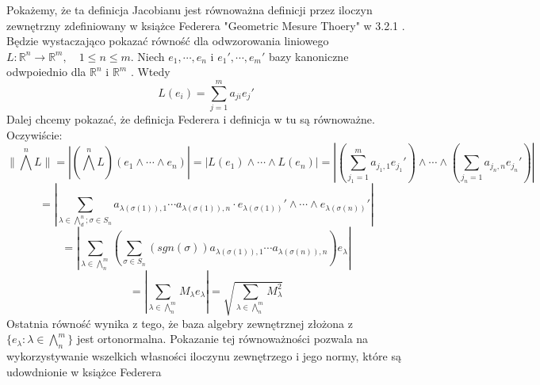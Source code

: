 \begin{lem}
	Pokażemy, że ta definicja Jacobianu jest równoważna definicji przez iloczyn zewnętrzny zdefiniowany w książce Federera "Geometric Mesure Thoery" w 3.2.1 \citep{Federer}. Będzie wystaczająco pokazać równość dla odwzorowania liniowego $L: \mathbb{R}^n \rightarrow \mathbb{R}^m, \quad 1 \leq n \leq m$. Niech $e_1, \cdots, e_n$ i $e_1', \cdots, e_m'$ bazy kanoniczne odwpoiednio dla $\mathbb{R}^n$ i $\mathbb{R}^m$ . Wtedy $$
		L(e_i) = \sum_{j=1}^m a_{ji} e_j'
	$$
	Dalej chcemy pokazać, że definicja Federera i definicja w tu są równoważne. Oczywiście:
	$$
		\| \bigwedge^n L \| = |(\bigwedge^n L) (e_1 \wedge \cdots \wedge e_n)| 
		= |L(e_1) \wedge \cdots \wedge L(e_n)| 
		= \left| (\sum^m_{j_1=1}a_{j_1, 1} e_{j_1}') \wedge \cdots \wedge (\sum_{j_n=1} a_{j_n, n} e_{j_n}') \right| 
	$$
	$$
		= \left| \sum_{\lambda \in \bigwedge^n_d; \sigma \in S_n} a_{\lambda(\sigma(1)), 1} \cdots a_{\lambda(\sigma(1)), n} 
			\cdot e_{\lambda(\sigma(1))}' \wedge \cdots \wedge e_{\lambda(\sigma(n))}'\right|
	$$
	$$
		= \left| \sum_{\lambda \in \bigwedge^m_n} \left( \sum_{\sigma \in S_n} (sgn(\sigma))a_{\lambda(\sigma(1)), 1} \cdots a_{\lambda(\sigma(n)), n} \right) e_{\lambda} \right|
	$$
	$$
		= \left| \sum_{\lambda \in \bigwedge_n^m} M_{\lambda} e_{\lambda} \right| = \sqrt{\sum_{\lambda \in \bigwedge_n^m} M_{\lambda}^2}
	$$
	Ostatnia równość wynika z tego, że baza algebry zewnętrznej złożona z $\{ e_{\lambda}: \lambda \in \bigwedge_n^m\}$ jest ortonormalna.\newline
	Pokazanie tej równoważności pozwala na wykorzystywanie wszelkich własności iloczynu zewnętrzego i jego normy, które są udowdnionie w książce Federera \citep{Federer}
\end{lem}